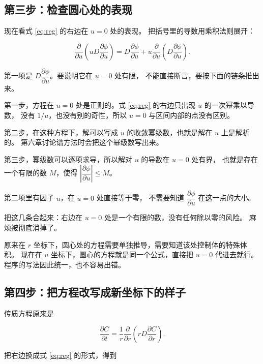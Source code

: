 \subsection{第三步：检查圆心处的表现}

现在看式 \eqref{eq:reg} 的右边在 $u=0$ 处的表现。
把括号里的导数用乘积法则展开：

\begin{equation}
\frac{\partial}{\partial u}\left(uD\frac{\partial\phi}{\partial u}\right)
= D\frac{\partial\phi}{\partial u} + u\frac{\partial}{\partial u}\left(D\frac{\partial\phi}{\partial u}\right).
\label{eq:expand-reg}
\end{equation}

第一项是 $D\dfrac{\partial\phi}{\partial u}$。要说明它在 $u=0$ 处有限，
不能直接断言，要按下面的链条推出来。

第一步，方程在 $u=0$ 处是正则的。式 \eqref{eq:reg} 的右边只出现 $u$ 的一次幂乘以导数，
没有 $1/u$，也没有别的奇性，所以 $u=0$ 与区间内部的点没有区别。

第二步，在这种方程下，解可以写成 $u$ 的收敛幂级数，也就是解在 $u$ 上是解析的。
第六章讨论谱方法时会把这个幂级数写出来。

第三步，幂级数可以逐项求导，所以解对 $u$ 的导数在 $u=0$ 处有界，
也就是存在一个有限的数 $M$，使得 $\left|\dfrac{\partial\phi}{\partial u}\right|\le M$。

第二项里有因子 $u$，在 $u=0$ 处直接等于零，
不需要知道 $\dfrac{\partial\phi}{\partial u}$ 在这一点的大小。

把这几条合起来：右边在 $u=0$ 处是一个有限的数，没有任何除以零的风险。
麻烦被彻底消掉了。

原来在 $r$ 坐标下，圆心处的方程需要单独推导，需要知道该处控制体的特殊体积。
现在在 $u$ 坐标下，圆心的方程就是同一个公式，直接把 $u=0$ 代进去就行。
程序的写法因此统一，也不容易出错。

\subsection{第四步：把方程改写成新坐标下的样子}

传质方程原来是

\begin{equation}
\frac{\partial C}{\partial t}=\frac{1}{r}\frac{\partial}{\partial r}\left(rD\frac{\partial C}{\partial r}\right).
\end{equation}

把右边换成式 \eqref{eq:reg} 的形式，得到

